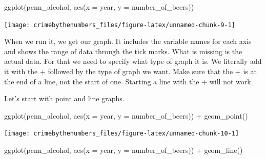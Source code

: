 \documentclass[
]{krantz}
\makeatletter
\newenvironment{Shaded}{\begin{snugshade}}{\end{snugshade}}
\newcommand{\AttributeTok}[1]{\textcolor[rgb]{0.61,0.61,0.61}{#1}}
\newcommand{\FunctionTok}[1]{\textcolor[rgb]{0,0,0}{#1}}
\newcommand{\NormalTok}[1]{#1}
\newcommand{\OtherTok}[1]{\textcolor[rgb]{0.37,0.37,0.37}{#1}}
\newcommand{\SpecialCharTok}[1]{\textcolor[rgb]{0,0,0}{#1}}
\newenvironment{kframe}{%
\medskip{}
\setlength{\fboxsep}{.8em}
 \def\at@end@of@kframe{}%
 \ifinner\ifhmode%
  \def\at@end@of@kframe{\end{minipage}}%
  \begin{minipage}{\columnwidth}%
 \fi\fi%
 \def\FrameCommand##1{\hskip\@totalleftmargin \hskip-\fboxsep
 \colorbox{shadecolor}{##1}\hskip-\fboxsep
     \hskip-\linewidth \hskip-\@totalleftmargin \hskip\columnwidth}%
 \MakeFramed {\advance\hsize-\width
   \@totalleftmargin\z@ \linewidth\hsize
   \@setminipage}}%
 {\par\unskip\endMakeFramed%
 \at@end@of@kframe}
\renewenvironment{Shaded}{\begin{kframe}}{\end{kframe}}
\makeatother
\begin{document}
\begin{Shaded}
\end{Shaded}

\begin{Shaded}
\begin{Highlighting}[]
\FunctionTok{ggplot}\NormalTok{(penn\_alcohol, }\FunctionTok{aes}\NormalTok{(}\AttributeTok{x =}\NormalTok{ year,}
                         \AttributeTok{y =}\NormalTok{ number\_of\_beers))}
\end{Highlighting}
\end{Shaded}

\begin{center}\texttt{[image: crimebythenumbers\_files/figure-latex/unnamed-chunk-9-1]} \end{center}

When we run it, we get our graph. It includes the variable names for each axis and shows the range of data through the tick marks. What is missing is the actual data. For that we need to specify what type of graph it is. We literally add it with the + followed by the type of graph we want. Make sure that the + is at the end of a line, not the start of one. Starting a line with the + will not work.

Let's start with point and line graphs.

\begin{Shaded}
\begin{Highlighting}[]
\FunctionTok{ggplot}\NormalTok{(penn\_alcohol, }\FunctionTok{aes}\NormalTok{(}\AttributeTok{x =}\NormalTok{ year, }\AttributeTok{y =}\NormalTok{ number\_of\_beers)) }\SpecialCharTok{+}
  \FunctionTok{geom\_point}\NormalTok{()}
\end{Highlighting}
\end{Shaded}

\begin{center}\texttt{[image: crimebythenumbers\_files/figure-latex/unnamed-chunk-10-1]} \end{center}

\begin{Shaded}
\begin{Highlighting}[]
\FunctionTok{ggplot}\NormalTok{(penn\_alcohol, }\FunctionTok{aes}\NormalTok{(}\AttributeTok{x =}\NormalTok{ year, }\AttributeTok{y =}\NormalTok{ number\_of\_beers)) }\SpecialCharTok{+}
  \FunctionTok{geom\_line}\NormalTok{()}
\end{Highlighting}
\end{Shaded}
\end{document}
